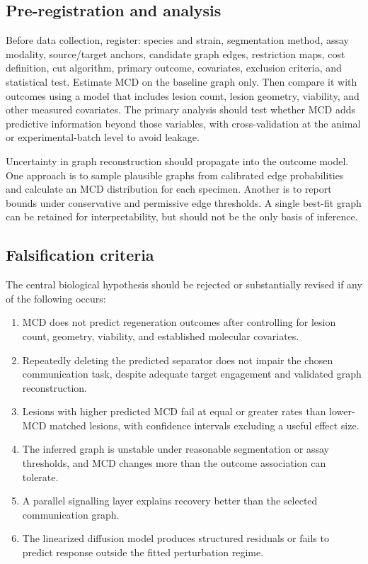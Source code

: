 \documentclass[12pt,a4paper]{article}
\begin{document}
\subsection{Pre-registration and analysis}
Before data collection, register: species and strain, segmentation method, assay modality, source/target anchors, candidate graph edges, restriction maps, cost definition, cut algorithm, primary outcome, covariates, exclusion criteria, and statistical test. Estimate MCD on the baseline graph only. Then compare it with outcomes using a model that includes lesion count, lesion geometry, viability, and other measured covariates. The primary analysis should test whether MCD adds predictive information beyond those variables, with cross-validation at the animal or experimental-batch level to avoid leakage.

Uncertainty in graph reconstruction should propagate into the outcome model. One approach is to sample plausible graphs from calibrated edge probabilities and calculate an MCD distribution for each specimen. Another is to report bounds under conservative and permissive edge thresholds. A single best-fit graph can be retained for interpretability, but should not be the only basis of inference.

\subsection{Falsification criteria}
The central biological hypothesis should be rejected or substantially revised if any of the following occurs:
\begin{enumerate}
\item MCD does not predict regeneration outcomes after controlling for lesion count, geometry, viability, and established molecular covariates.
\item Repeatedly deleting the predicted separator does not impair the chosen communication task, despite adequate target engagement and validated graph reconstruction.
\item Lesions with higher predicted MCD fail at equal or greater rates than lower-MCD matched lesions, with confidence intervals excluding a useful effect size.
\item The inferred graph is unstable under reasonable segmentation or assay thresholds, and MCD changes more than the outcome association can tolerate.
\item A parallel signalling layer explains recovery better than the selected communication graph.
\item The linearized diffusion model produces structured residuals or fails to predict response outside the fitted perturbation regime.
\end{enumerate}
\end{document}
